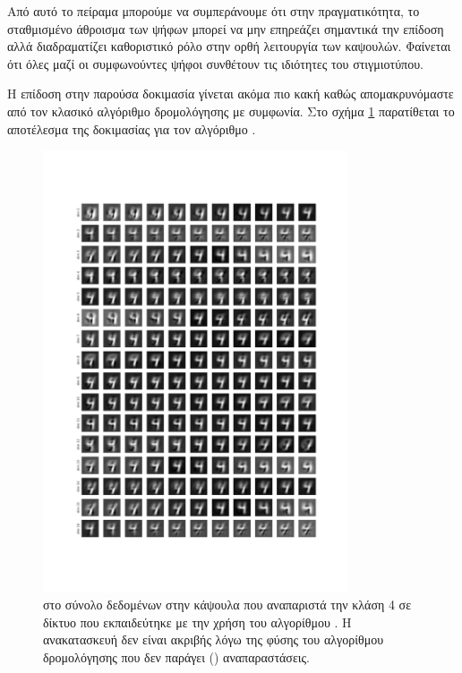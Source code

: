 Από αυτό το πείραμα μπορούμε να συμπεράνουμε ότι στην πραγματικότητα, το σταθμισμένο άθροισμα των ψήφων μπορεί να μην επηρεάζει σημαντικά την επίδοση αλλά διαδραματίζει καθοριστικό ρόλο στην ορθή λειτουργία των καψουλών. Φαίνεται ότι όλες μαζί οι συμφωνούντες ψήφοι συνθέτουν τις ιδιότητες του στιγμιοτύπου.\par

Η επίδοση στην παρούσα δοκιμασία γίνεται ακόμα πιο κακή καθώς απομακρυνόμαστε από τον κλασικό αλγόριθμο δρομολόγησης με συμφωνία. Στο σχήμα \ref{fig:exp_method_1_special_perturb_3} παρατίθεται το αποτέλεσμα της δοκιμασίας για τον αλγόριθμο .\par

\begin{figure}[h]
    \centering
    \includegraphics[width=0.8\textwidth]{images/chapter experiments/method 1/image 8/perturbations_19.png}
    \caption{ στο σύνολο δεδομένων  στην κάψουλα  που αναπαριστά την κλάση 4 σε δίκτυο που εκπαιδεύτηκε με την χρήση του αλγορίθμου . Η ανακατασκευή δεν είναι ακριβής λόγω της φύσης του αλγορίθμου δρομολόγησης που δεν παράγει  () αναπαραστάσεις.}
    \label{fig:exp_method_1_special_perturb_3}
  \end{figure}

